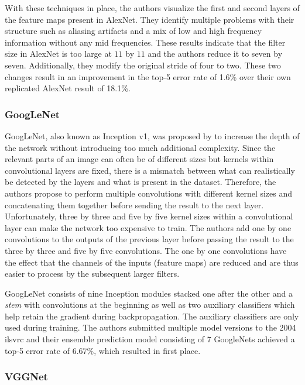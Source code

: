\documentclass[final]{vutinfth} %
\begin{document}
With these techniques in place, the authors visualize the first and
second layers of the feature maps present in AlexNet. They identify
multiple problems with their structure such as aliasing artifacts and
a mix of low and high frequency information without any mid
frequencies. These results indicate that the filter size in AlexNet is
too large at $11$ by $11$ and the authors reduce it to seven by
seven. Additionally, they modify the original stride of four to
two. These two changes result in an improvement in the top-5 error
rate of 1.6\% over their own replicated AlexNet result of 18.1\%.

\subsubsection{GoogLeNet}
\label{sssec:theory-googlenet}

GoogLeNet, also known as Inception v1, was proposed by
\textcite{szegedy2015} to increase the depth of the network without
introducing too much additional complexity. Since the relevant parts
of an image can often be of different sizes but kernels within
convolutional layers are fixed, there is a mismatch between what can
realistically be detected by the layers and what is present in the
dataset. Therefore, the authors propose to perform multiple
convolutions with different kernel sizes and concatenating them
together before sending the result to the next layer. Unfortunately,
three by three and five by five kernel sizes within a convolutional
layer can make the network too expensive to train. The authors add one
by one convolutions to the outputs of the previous layer before
passing the result to the three by three and five by five
convolutions. The one by one convolutions have the effect that the
channels of the inputs (feature maps) are reduced and are thus easier
to process by the subsequent larger filters.

GoogLeNet consists of nine Inception modules stacked one after the
other and a \emph{stem} with convolutions at the beginning as well as
two auxiliary classifiers which help retain the gradient during
backpropagation. The auxiliary classifiers are only used during
training. The authors submitted multiple model versions to the 2004
\gls{ilsvrc} and their ensemble prediction model consisting of 7
GoogleNets achieved a top-5 error rate of 6.67\%, which resulted in
first place.

\subsubsection{VGGNet}
\label{sssec:theory-vggnet}
\end{document}
